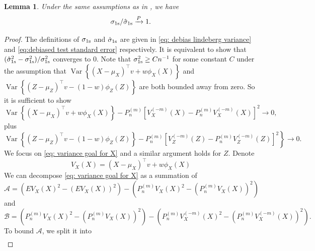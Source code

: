 \documentclass[11pt]{article}
\newtheorem{lemma}[theorem]{Lemma}
\begin{document}
\begin{lemma}\label{lemma: variance consistency} Under the same assumptions as in , we have
\begin{equation*}
\sigma_{\rm 1s} / \hat{\sigma}_{\rm 1s} \xrightarrow{P} 1.
\end{equation*}
\end{lemma}
\begin{proof}
The definitions of $\sigma_{\rm 1s}$ and $\hat \sigma_{\rm 1s}$ are given in \eqref{eq: debias lindeberg variance} and \eqref{eq:debiased test standard error} respectively. It is equivalent to show that $(\hat{\sigma}_{\rm 1s}^2 - \sigma^2_{\rm 1s}) / \sigma^2_{\rm 1s}$ converges to $0$. Note that $\sigma_{\rm 1s}^2 \geq Cn^{-1}$ for some constant $C$ under the assumption that $\operatorname{Var}\left\{\left(X-\mu_X\right)^{\top} v+w \phi_X(X)\right\}$ and $\operatorname{Var}\left\{\left(Z-\mu_Z\right)^{\top} v-(1-w) \phi_Z(Z)\right\}$ are both bounded away from zero. So it is sufficient to show
\begin{equation}\label{eq: variance goal for X}
 \operatorname{Var}\left\{\left(X-\mu_X\right)^{\top} v+w \phi_X(X)\right\} - P_n^{(m)}\left[V_X^{(-m)}(X)-P_n^{(m)} V_X^{(-m)}(X)\right]^2 \rightarrow 0,
\end{equation}
plus 
\begin{equation*}
 \operatorname{Var}\left\{\left(Z-\mu_Z\right)^{\top} v-(1-w) \phi_Z(Z)\right\} - \left.P_n^{(m)}\left[V_Z^{(-m)}(Z)-P_n^{(m)} V_Z^{(-m)}(Z)\right]^2\right\} \rightarrow 0.
\end{equation*}
We focus on \eqref{eq: variance goal for X} and a similar argument holds for $Z$. Denote 
\begin{equation*}
V_X(X)=\left(X-\mu_X\right)^{\top} v+w \phi_X(X)
\end{equation*}
We can decompose \eqref{eq: variance goal for X} as a summation of 
\begin{equation*}
\mathcal{A}=\left(E V_X(X)^2-\left(E V_X(X)\right)^2\right)-\left(P_n^{(m)} V_X(X)^2-\left(P_n^{(m)} V_X(X)\right)^2\right)
\end{equation*}
and 
\begin{equation*}
\mathcal{B}=\left(P_n^{(m)} V_X(X)^2-\left(P_n^{(m)} V_X(X)\right)^2\right)-\left(P_n^{(m)} V_X^{(-m)}(X)^2-\left(P_n^{(m)} V_X^{(-m)}(X)\right)^2\right) .
\end{equation*}
To bound $\mathcal{A}$, we split it into
\begin{equation}\label{eq: split A}
\begin{aligned}

\end{aligned}
\end{equation}
\end{proof}
\end{document}
